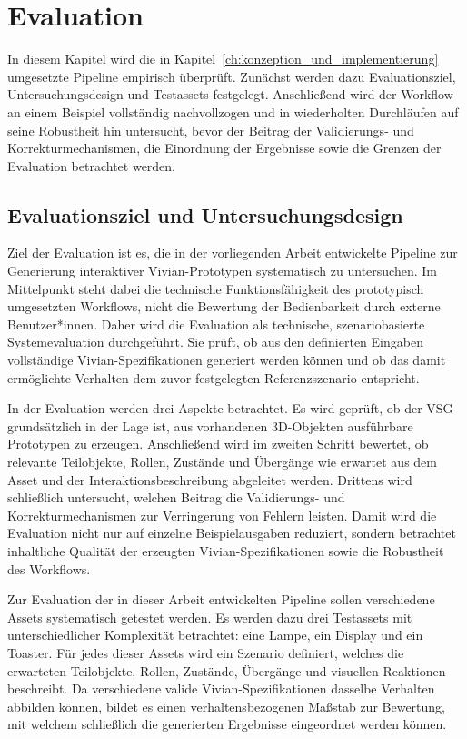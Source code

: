 ﻿\chapter{Evaluation}\label{ch:evaluation}

In diesem Kapitel wird die in Kapitel~\ref{ch:konzeption_und_implementierung} umgesetzte Pipeline empirisch überprüft. Zunächst werden dazu Evaluationsziel, Untersuchungsdesign und Testassets festgelegt. Anschließend wird der Workflow an einem Beispiel vollständig nachvollzogen und in wiederholten Durchläufen auf seine Robustheit hin untersucht, bevor der Beitrag der Validierungs- und Korrekturmechanismen, die Einordnung der Ergebnisse sowie die Grenzen der Evaluation betrachtet werden.

\section{Evaluationsziel und Untersuchungsdesign}
Ziel der Evaluation ist es, die in der vorliegenden Arbeit entwickelte Pipeline zur Generierung interaktiver Vivian-Prototypen systematisch zu untersuchen. Im Mittelpunkt steht dabei die technische Funktionsfähigkeit des prototypisch umgesetzten Workflows, nicht die Bewertung der Bedienbarkeit durch externe Benutzer*innen. Daher wird die Evaluation als technische, szenariobasierte Systemevaluation durchgeführt. Sie prüft, ob aus den definierten Eingaben vollständige Vivian-Spezifikationen generiert werden können und ob das damit ermöglichte Verhalten dem zuvor festgelegten Referenzszenario entspricht.

In der Evaluation werden drei Aspekte betrachtet. Es wird geprüft, ob der VSG grundsätzlich in der Lage ist, aus vorhandenen 3D-Objekten ausführbare Prototypen zu erzeugen. Anschließend wird im zweiten Schritt bewertet, ob relevante Teilobjekte, Rollen, Zustände und Übergänge wie erwartet aus dem Asset und der Interaktionsbeschreibung abgeleitet werden. Drittens wird schließlich untersucht, welchen Beitrag die Validierungs- und Korrekturmechanismen zur Verringerung von Fehlern leisten. Damit wird die Evaluation nicht nur auf einzelne Beispielausgaben reduziert, sondern betrachtet inhaltliche Qualität der erzeugten Vivian-Spezifikationen sowie die Robustheit des Workflows.

Zur Evaluation der in dieser Arbeit entwickelten Pipeline sollen verschiedene Assets systematisch getestet werden.
Es werden dazu drei Testassets mit unterschiedlicher Komplexität betrachtet: eine Lampe, ein Display und ein Toaster. Für jedes dieser Assets wird ein Szenario definiert, welches die erwarteten Teilobjekte, Rollen, Zustände, Übergänge und visuellen Reaktionen beschreibt. Da verschiedene valide Vivian-Spezifikationen dasselbe Verhalten abbilden können, bildet es einen verhaltensbezogenen Maßstab zur Bewertung, mit welchem schließlich die generierten Ergebnisse eingeordnet werden können.


